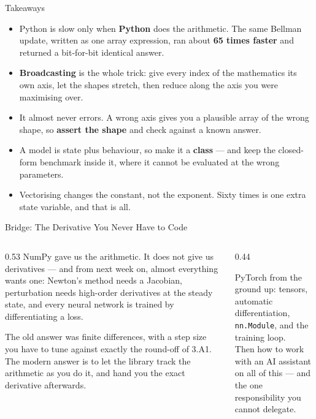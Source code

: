 \begin{frame}{Takeaways}
\begin{takeawaybox}
\begin{itemize}\small
  \item Python is slow only when \textbf{Python} does the arithmetic. The same Bellman update, written as one array expression, ran about \textbf{65 times faster} and returned a bit-for-bit identical answer.
  \item \textbf{Broadcasting} is the whole trick: give every index of the mathematics its own axis, let the shapes stretch, then reduce along the axis you were maximising over.
  \item It almost never errors. A wrong axis gives you a plausible array of the wrong shape, so \textbf{assert the shape} and check against a known answer.
  \item A model is state plus behaviour, so make it a \textbf{class} --- and keep the closed-form benchmark inside it, where it cannot be evaluated at the wrong parameters.
  \item Vectorising changes the constant, not the exponent. Sixty times is one extra state variable, and that is all.
\end{itemize}
\end{takeawaybox}
\end{frame}

\begin{frame}{Bridge: The Derivative You Never Have to Code}
\begin{columns}[T]
\begin{column}{0.53\textwidth}
\small
NumPy gave us the arithmetic. It does not give us derivatives --- and from next week on, almost everything wants one: Newton's method needs a Jacobian, perturbation needs high-order derivatives at the steady state, and every neural network is trained by differentiating a loss.
\medskip

The old answer was finite differences, with a step size you have to tune against exactly the round-off of 3.A1. The modern answer is to let the library track the arithmetic as you do it, and hand you the exact derivative afterwards.
\end{column}
\begin{column}{0.44\textwidth}
\begin{conceptbox}[title=\textbf{Next (3.B3)}]\small
PyTorch from the ground up: tensors, automatic differentiation, \texttt{nn.Module}, and the training loop.\\[1mm]
Then how to work with an AI assistant on all of this --- and the one responsibility you cannot delegate.
\end{conceptbox}
\end{column}
\end{columns}
\end{frame}


